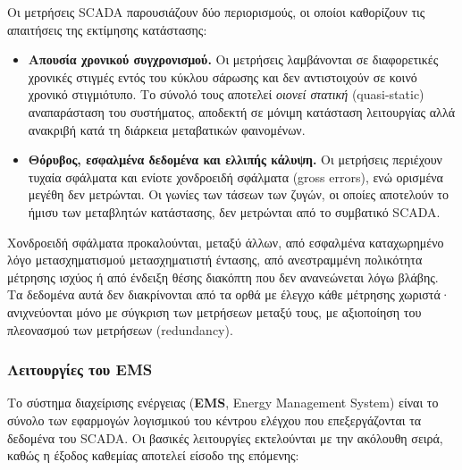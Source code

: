 Οι μετρήσεις SCADA παρουσιάζουν δύο περιορισμούς, οι οποίοι καθορίζουν τις απαιτήσεις της
εκτίμησης κατάστασης:

\begin{itemize}
\item \textbf{Απουσία χρονικού συγχρονισμού.} Οι μετρήσεις λαμβάνονται σε διαφορετικές
      χρονικές στιγμές εντός του κύκλου σάρωσης και δεν αντιστοιχούν σε κοινό χρονικό
      στιγμιότυπο. Το σύνολό τους αποτελεί \emph{οιονεί στατική} (quasi-static)
      αναπαράσταση του συστήματος, αποδεκτή σε μόνιμη κατάσταση λειτουργίας αλλά
      ανακριβή κατά τη διάρκεια μεταβατικών φαινομένων.
\item \textbf{Θόρυβος, εσφαλμένα δεδομένα και ελλιπής κάλυψη.} Οι μετρήσεις περιέχουν
      τυχαία σφάλματα και ενίοτε χονδροειδή σφάλματα (gross errors), ενώ ορισμένα μεγέθη
      δεν μετρώνται. Οι γωνίες των τάσεων των ζυγών, οι οποίες αποτελούν το ήμισυ των
      μεταβλητών κατάστασης, δεν μετρώνται από το συμβατικό SCADA.
\end{itemize}

Χονδροειδή σφάλματα προκαλούνται, μεταξύ άλλων, από εσφαλμένα καταχωρημένο λόγο
μετασχηματισμού μετασχηματιστή έντασης, από ανεστραμμένη πολικότητα μέτρησης ισχύος ή από
ένδειξη θέσης διακόπτη που δεν ανανεώνεται λόγω βλάβης. Τα δεδομένα αυτά δεν διακρίνονται
από τα ορθά με έλεγχο κάθε μέτρησης χωριστά· ανιχνεύονται μόνο με σύγκριση των μετρήσεων
μεταξύ τους, με αξιοποίηση του πλεονασμού των μετρήσεων (redundancy).

\subsubsection*{Λειτουργίες του EMS}

Το σύστημα διαχείρισης ενέργειας (\textbf{EMS}, Energy Management System) είναι το σύνολο των
εφαρμογών λογισμικού του κέντρου ελέγχου που επεξεργάζονται τα δεδομένα του SCADA. Οι
βασικές λειτουργίες εκτελούνται με την ακόλουθη σειρά, καθώς η έξοδος καθεμίας αποτελεί
είσοδο της επόμενης:

